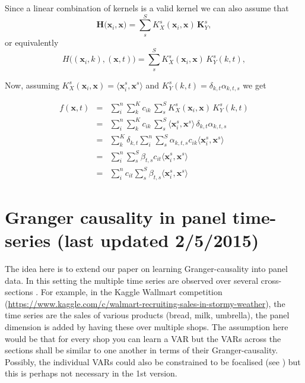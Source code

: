 \documentclass[a4paper]{article}
\newcommand{\vc}[1]{\mathbf{#1}}
\newif\ifShowComments
\newcommand{\note}[1]{\ifShowComments {\color{blue}\emph{Note: #1}} \else {} \fi}
\begin{document}
Since a linear combination of kernels is a valid kernel we can also assume that
\begin{equation}
\vc{H}\big(\vc{x}_i,\vc{x}) = \sum_s^S K^s_X(\vc{x}_i,\vc{x}) \, \vc{K}^s_Y,
\end{equation}
or equivalently
\begin{equation}
H\big((\vc{x}_i,k),(\vc{x},t)\big) = \sum_s^S K^s_X(\vc{x}_i,\vc{x}) \, K^s_Y(k,t),
\end{equation}

Now, assuming $K^s_X(\vc{x}_i,\vc{x}) = \langle \vc{x}^s_i, \vc{x}^s \rangle$ and $K^s_Y(k,t) = \delta_{k,t} \alpha_{k,t,s}$ we get

\begin{eqnarray}
f(\vc{x},t)
& = & \sum_i^n \sum_k^K c_{ik} \, \sum_s^S K^s_X(\vc{x}_i,\vc{x}) \, K^s_Y(k,t) \nonumber \\
& = & \sum_i^n \sum_k^K c_{ik} \, \sum_s^S  \langle \vc{x}^s_i, \vc{x}^s \rangle \,  \delta_{k,t} \alpha_{k,t,s} \nonumber \\
& = & \sum_k^K \delta_{k,t} \sum_i^n \sum_s^S \alpha_{k,t,s}  c_{ik} \langle \vc{x}^s_i, \vc{x}^s \rangle \nonumber \\
& = & \sum_i^n \sum_s^S \beta_{t,s}  c_{it} \langle \vc{x}^s_i, \vc{x}^s \rangle \nonumber \\
& = & \sum_i^n c_{it} \sum_s^S \beta_{t,s}  \langle \vc{x}^s_i, \vc{x}^s \rangle \nonumber
\end{eqnarray}




\section{Granger causality in panel time-series (last updated 2/5/2015)}\label{sec:GrangerInPanels}

The idea here is to extend our paper on learning Granger-causality \cite{Gregorova2015} into panel data.
In this setting the multiple time series are observed over several \note{independent?} cross-sections \note{is this the right term?}.
For example, in the Kaggle Wallmart competition (\url{https://www.kaggle.com/c/walmart-recruiting-sales-in-stormy-weather}), the time series are the sales of various products (bread, milk, umbrella), the panel dimension is added by having these over multiple shops.
The assumption here would be that for every shop you can learn a VAR but the VARs across the sections shall be similar to one another in terms of their Granger-causality.
Possibly, the individual VARs could also be constrained to be focalised (see \cite{Gregorova2015}) but this is perhaps not necessary in the 1st version. 
\end{document}
